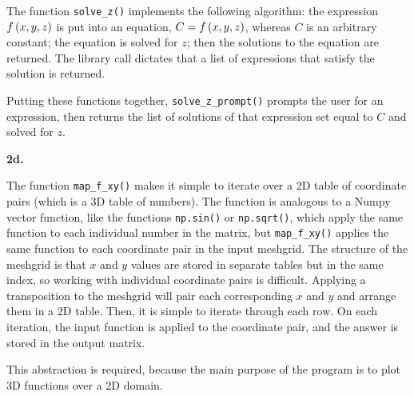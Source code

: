 \documentclass[11pt]{article}
\begin{document}
The function \verb|solve_z()| implements the following algorithm: the expression $f\left({x,y,z}\right)$ is put into an
equation, $C=f\left({x,y,z}\right)$, whereas $C$ is an arbitrary constant; the equation is solved for $z$; then the solutions to the
equation are returned. The library call dictates that a list of expressions that satisfy the solution is returned.\double

Putting these functions together, \verb|solve_z_prompt()| prompts the user for an expression, then returns the list of solutions
of that expression set equal to $C$ and solved for $z$.\double

\textbf{2d.}


The function \verb|map_f_xy()| makes it simple to iterate over a 2D table of coordinate pairs (which is a 3D table of numbers).
The function is analogous to a Numpy vector function, like the functions \verb|np.sin()| or \verb|np.sqrt()|, which apply the
same function to each individual number in the matrix, but \verb|map_f_xy()| applies the same function to each coordinate pair
in the input meshgrid. The structure of the meshgrid is that $x$ and $y$ values are stored in separate tables but in the same
index, so working with individual coordinate pairs is difficult. Applying a transposition to the meshgrid will pair each
corresponding $x$ and $y$ and arrange them in a 2D table. Then, it is simple to iterate through each row. On each iteration,
the input function is applied to the coordinate pair, and the answer is stored in the output matrix.\double

This abstraction is required, because the main purpose of the program is to plot 3D functions over a 2D domain.
\end{document}
